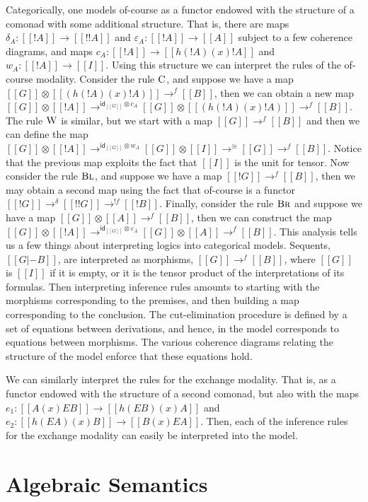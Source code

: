 \documentclass{article}
\let\mto\to                     %
\let\to\relax                   %
\newcommand{\to}{\rightarrow}
\newcommand{\id}{\mathsf{id}}
\begin{document}
Categorically, one models of-course as a functor endowed with the structure
of a comonad with some additional structure.  That is, there are maps
$\delta_A : [[!A]] \mto [[!!A]]$ and $\varepsilon_A : [[!A]] \mto [[A]]$
subject to a few coherence diagrams, and maps $c_A : [[!A]] \mto
[[h(!A) (x) !A]]$ and $w_A : [[!A]] \mto [[I]]$.  Using this structure we can
interpret the rules of the of-course modality.  Consider the rule
$\textsc{C}$, and suppose we have a map
$[[G]] \otimes [[(h(!A) (x) !A)]] \mto^{f} [[B]]$, then we can obtain
a new map
$[[G]] \otimes [[!A]] \mto^{\id_{[[G]]} \otimes c_A} [[G]] \otimes [[(h(!A) (x) !A)]] \mto^f [[B]]$.
The rule $\textsc{W}$ is similar, but we start with a map $[[G]]
\mto^f [[B]]$ and then we can define the map
$[[G]] \otimes [[!A]] \mto^{\id_{[[G]]} \otimes w_A} [[G]] \otimes [[I]] \mto^\cong [[G]] \mto^{f} [[B]]$.
Notice that the previous map exploits the fact that $[[I]]$ is the
unit for tensor.  Now consider the rule $\textsc{Bl}$, and suppose
we have a map $[[!{G}]] \mto^f [[B]]$, then we may obtain a second map
using the fact that of-course is a functor $[[!{G}]] \mto^{\delta}
[[!{!{G}}]] \mto^{!f} [[!B]]$.  Finally, consider the rule
$\textsc{Br}$ and suppose we have a map $[[G]] \otimes [[A]]
\mto^f [[B]]$, then we can construct the map
$[[G]] \otimes [[!A]] \mto^{\id_{[[G]]} \otimes \varepsilon_A} [[G]]
\otimes [[A]] \mto^f [[B]]$.  This analysis tells us a few things
about interpreting logics into categorical models.  Sequents, $[[G |-
    B]]$, are interpreted as morphisms, $[[G]] \mto^f [[B]]$, where
$[[G]]$ is $[[I]]$ if it is empty, or it is the tensor product of the
interpretations of its formulas.  Then interpreting inference rules
amounts to starting with the morphisms corresponding to the premises,
and then building a map corresponding to the conclusion.  The
cut-elimination procedure is defined by a set of equations between
derivations, and hence, in the model corresponds to equations between
morphisms.  The various coherence diagrams relating the structure of
the model enforce that these equations hold.

We can similarly interpret the rules for the exchange modality.
That is, as a functor endowed with the structure of a second comonad,
but also with the maps $e_1 : [[A (x) E B]] \mto [[h(E B) (x) A]]$ and
$e_2 : [[h(E A) (x) B]] \mto [[B (x) E A]]$.  Then, each of the
inference rules for the exchange modality can easily be interpreted
into the model.

\section{Algebraic Semantics}
\end{document}
